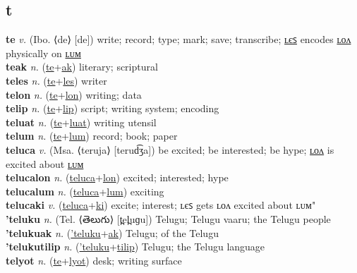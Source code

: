 \subsection{t}

\textbf{te} \textit{v.} (Ibo. ⟨de⟩ [de])
write; record; type; mark; save; transcribe; \hyperref[teles]{ʟєꜱ} encodes \hyperref[telon]{ʟᴏᴧ} physically on \hyperref[telum]{ʟᴜᴍ} \label{te} \\
\textbf{teak} \textit{n.} (\hyperref[te]{te}+\hyperref[ak]{ak})
literary; scriptural \label{teak} \\
\textbf{teles} \textit{n.} (\hyperref[te]{te}+\hyperref[les]{les})
writer \label{teles} \\
\textbf{telon} \textit{n.} (\hyperref[te]{te}+\hyperref[lon]{lon})
writing; data \label{telon} \\
\textbf{telip} \textit{n.} (\hyperref[te]{te}+\hyperref[lip]{lip})
script; writing system; encoding \label{telip} \\
\textbf{teluat} \textit{n.} (\hyperref[te]{te}+\hyperref[luat]{luat})
writing utensil \label{teluat} \\
\textbf{telum} \textit{n.} (\hyperref[te]{te}+\hyperref[lum]{lum})
record; book; paper \label{telum} \\
\textbf{teluca} \textit{v.} (Msa. ⟨teruja⟩ [terud͡ʒa])
be excited; be interested; be hype; \hyperref[telucalon]{ʟᴏᴧ} is excited about \hyperref[telucalum]{ʟᴜᴍ} \label{teluca} \\
\textbf{telucalon} \textit{n.} (\hyperref[teluca]{teluca}+\hyperref[lon]{lon})
excited; interested; hype \label{telucalon} \\
\textbf{telucalum} \textit{n.} (\hyperref[teluca]{teluca}+\hyperref[lum]{lum})
exciting \label{telucalum} \\
\textbf{telucaki} \textit{v.} (\hyperref[teluca]{teluca}+\hyperref[ki]{ki})
excite; interest; ʟєꜱ gets ʟᴏᴧ excited about ʟᴜᴍ" \label{telucaki} \\
\textbf{'teluku} \textit{n.} (Tel. ⟨తెలుగు⟩ [t̪el̪uɡu])
Telugu; Telugu vaaru; the Telugu people \label{'teluku} \\
\textbf{'telukuak} \textit{n.} (\hyperref['teluku]{'teluku}+\hyperref[ak]{ak})
Telugu; of the Telugu \label{'telukuak} \\
\textbf{'telukutilip} \textit{n.} (\hyperref['teluku]{'teluku}+\hyperref[tilip]{tilip})
Telugu; the Telugu language \label{'telukutilip} \\
\textbf{telyot} \textit{n.} (\hyperref[te]{te}+\hyperref[lyot]{lyot})
desk; writing surface \label{telyot} \\
